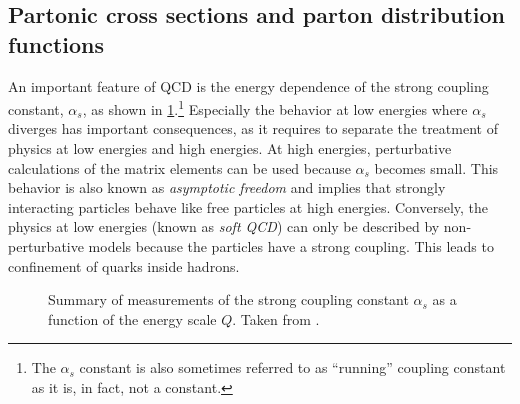 \subsection{Partonic cross sections and parton distribution functions}
\label{subsec:factorisation}

An important feature of QCD is the energy dependence of the strong coupling constant, $\alpha_s$, as shown in \cref{fig:alphas}.\footnote{The $\alpha_s$ constant is also sometimes referred to as ``running'' coupling constant as it is, in fact, not a constant.} Especially the behavior at low energies where $\alpha_s$ diverges has important consequences, as it requires to separate the treatment of physics at low energies and high energies. 
At high energies, perturbative calculations of the matrix elements can be used because $\alpha_s$ becomes small. This behavior is also known as \emph{asymptotic freedom} and implies that strongly interacting particles behave like free particles at high energies. 
Conversely, the physics at low energies (known as \emph{soft QCD}) can only be described by non-perturbative models because the particles have a strong coupling. This leads to confinement of quarks inside hadrons.

\begin{figure}[t]
  \caption[Summary of measurements of the strong coupling constant $\alpha_s$.]{Summary of measurements of the strong coupling constant $\alpha_s$ as a function of the energy scale $Q$. Taken from . }
  \label{fig:alphas}
\end{figure}

